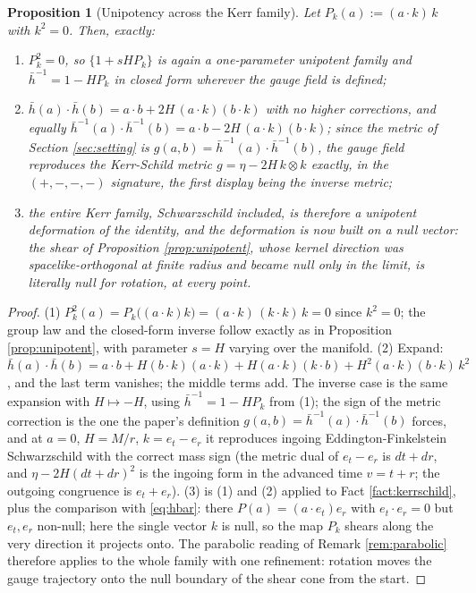 \documentclass[11pt]{article}
\newtheorem{proposition}[theorem]{Proposition}
\theoremstyle{definition}
\newcommand{\hb}{\bar{h}}
\newcommand{\er}{e_r}
\newcommand{\et}{e_t}
\begin{document}
\begin{proposition}[Unipotency across the Kerr family]\label{prop:kerrschild}
Let $P_k(a) := (a\cdot k)\,k$ with $k^2 = 0$. Then, exactly:
\begin{enumerate}
\item $P_k^2 = 0$, so $\{1 + sHP_k\}$ is again a one-parameter unipotent family and $\hb^{-1} = 1 - H P_k$ in closed form wherever the gauge field is defined;
\item $\hb(a)\cdot\hb(b) = a\cdot b + 2H\,(a\cdot k)(b\cdot k)$ with no higher corrections, and equally $\hb^{-1}(a)\cdot\hb^{-1}(b) = a\cdot b - 2H\,(a\cdot k)(b\cdot k)$; since the metric of Section \ref{sec:setting} is $g(a,b) = \hb^{-1}(a)\cdot\hb^{-1}(b)$, the gauge field reproduces the Kerr-Schild metric $g = \eta - 2H\,k\otimes k$ exactly, in the $(+,-,-,-)$ signature, the first display being the inverse metric;
\item the entire Kerr family, Schwarzschild included, is therefore a unipotent deformation of the identity, and the deformation is now built on a \emph{null} vector: the shear of Proposition \ref{prop:unipotent}, whose kernel direction was spacelike-orthogonal at finite radius and became null only in the limit, is literally null for rotation, at every point.
\end{enumerate}
\end{proposition}

\begin{proof}
(1) $P_k^2(a) = P_k\bigl((a\cdot k)k\bigr) = (a\cdot k)\,(k\cdot k)\,k = 0$ since $k^2 = 0$; the group law and the closed-form inverse follow exactly as in Proposition \ref{prop:unipotent}, with parameter $s = H$ varying over the manifold. (2) Expand: $\hb(a)\cdot\hb(b) = a\cdot b + H(b\cdot k)(a\cdot k) + H(a\cdot k)(k\cdot b) + H^2 (a\cdot k)(b\cdot k)\,k^2$, and the last term vanishes; the middle terms add. The inverse case is the same expansion with $H \mapsto -H$, using $\hb^{-1} = 1 - HP_k$ from (1); the sign of the metric correction is the one the paper's definition $g(a,b) = \hb^{-1}(a)\cdot\hb^{-1}(b)$ forces, and at $a = 0$, $H = M/r$, $k = \et - \er$ it reproduces ingoing Eddington-Finkelstein Schwarzschild with the correct mass sign (the metric dual of $\et - \er$ is $dt + dr$, and $\eta - 2H(dt + dr)^2$ is the ingoing form in the advanced time $v = t + r$; the outgoing congruence is $\et + \er$). (3) is (1) and (2) applied to Fact \ref{fact:kerrschild}, plus the comparison with \eqref{eq:hbar}: there $P(a) = (a\cdot\et)\er$ with $\et\cdot\er = 0$ but $\et, \er$ non-null; here the single vector $k$ is null, so the map $P_k$ shears along the very direction it projects onto. The parabolic reading of Remark \ref{rem:parabolic} therefore applies to the whole family with one refinement: rotation moves the gauge trajectory onto the null boundary of the shear cone from the start.
\end{proof}
\end{document}
